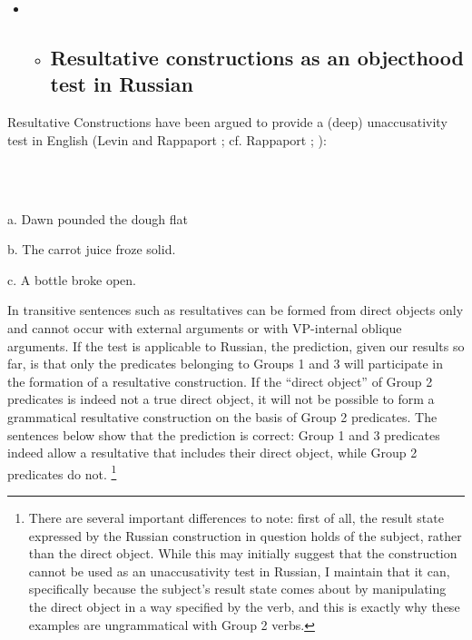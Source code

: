 \documentclass[output=paper,modfonts, nonflat]{langsci/langscibook}
\begin{document}
\begin{itemize}
\item \begin{itemize}
\item \subsection{Resultative constructions as an objecthood test in Russian}
\end{itemize}
\end{itemize}

Resultative Constructions have been argued to provide a (deep) unaccusativity test in English (Levin and Rappaport \citealt{Hovav1995}; cf. Rappaport \citealt{HovavLevin2001}; \citealt{Kratzer2005}):

\begin{styleinnerExample}
\ea%
    \label{ex:key:28}
    \gll\\
        \\
    \glt
    \z

          a. Dawn pounded the dough flat   \citep{Irvin2012}
\end{styleinnerExample}

\begin{styleinnerExample}
  b. The carrot juice froze solid. 
\end{styleinnerExample}

\begin{styleinnerExample}
  c. A bottle broke open. 
\end{styleinnerExample}

In transitive sentences such as  resultatives can be formed from direct objects only and cannot occur with external arguments or with VP-internal oblique arguments. If the test is applicable to Russian, the prediction, given our results so far, is that only the predicates belonging to Groups 1 and 3 will participate in the formation of a resultative construction. If the “direct object” of Group 2 predicates is indeed not a true direct object, it will not be possible to form a grammatical resultative construction on the basis of Group 2 predicates. The sentences below show that the prediction is correct: Group 1 and 3 predicates indeed allow a resultative that includes their direct object, while Group 2 predicates do not. \footnote{There are several important differences to note: first of all, the result state expressed by the Russian construction in question holds of the subject, rather than the direct object. While this may initially suggest that the construction cannot be used as an unaccusativity test in Russian, I maintain that it can, specifically because the subject’s result state comes about by manipulating the direct object in a way specified by the verb, and this is exactly why these examples are ungrammatical with Group 2 verbs.} 
\end{document}
